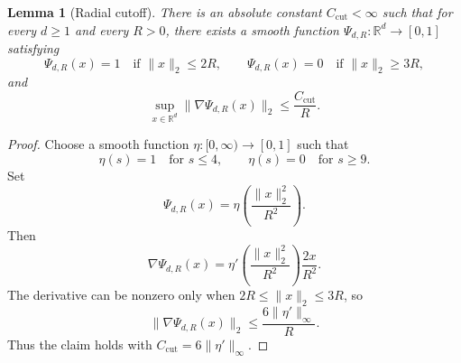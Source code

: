 \documentclass[11pt, reqno]{amsart}
\numberwithin{equation}{section}
\newtheorem{lemma}{Lemma}
\theoremstyle{remark}
\newcommand{\R}{\mathbb{R}}
\newcommand{\1}{\mathbf{1}}
\begin{document}
\begin{lemma}[Radial cutoff]
\label{lem:radial-cutoff}
There is an absolute constant $C_{\mathrm{cut}}<\infty$ such that for every
$d\ge 1$ and every $R>0$, there exists a smooth function
$\Psi_{d,R}:\R^d\to[0,1]$ satisfying
\[
\Psi_{d,R}(x)=1 \quad \text{if } \|x\|_2\le 2R,
\qquad
\Psi_{d,R}(x)=0 \quad \text{if } \|x\|_2\ge 3R,
\]
and
\[
\sup_{x\in\R^d}\|\nabla\Psi_{d,R}(x)\|_2
\le
\frac{C_{\mathrm{cut}}}{R}.
\]
\end{lemma}

\begin{proof}
Choose a smooth function $\eta:[0,\infty)\to[0,1]$ such that
\[
\eta(s)=1 \quad \text{for } s\le 4,
\qquad
\eta(s)=0 \quad \text{for } s\ge 9.
\]
Set
\[
\Psi_{d,R}(x)=\eta\!\left(\frac{\|x\|_2^2}{R^2}\right).
\]
Then
\[
\nabla\Psi_{d,R}(x)
=
\eta'\!\left(\frac{\|x\|_2^2}{R^2}\right)\frac{2x}{R^2}.
\]
The derivative can be nonzero only when $2R\le \|x\|_2\le 3R$, so
\[
\|\nabla\Psi_{d,R}(x)\|_2
\le
\frac{6\|\eta'\|_\infty}{R}.
\]
Thus the claim holds with $C_{\mathrm{cut}}=6\|\eta'\|_\infty$.
\end{proof}
\end{document}
